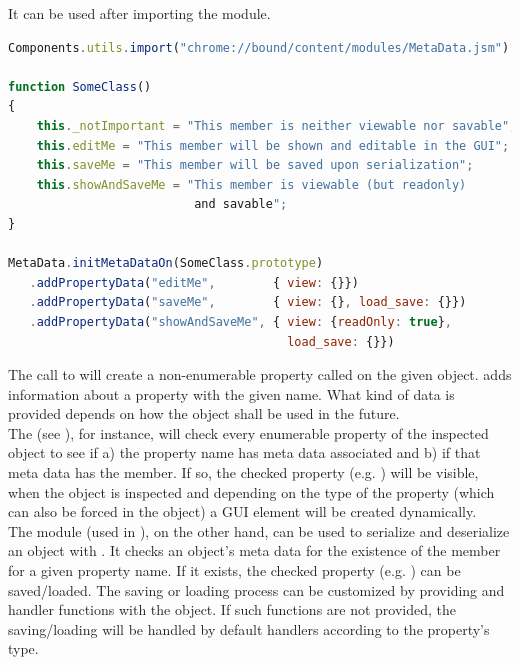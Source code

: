 It can be used after importing the  module.

\SingleSpacing
\begin{lstlisting}[language=JavaScript, caption=Adding meta data to \myProperName{JavaScript} objects]
Components.utils.import("chrome://bound/content/modules/MetaData.jsm")

function SomeClass()
{
	this._notImportant = "This member is neither viewable nor savable";
	this.editMe = "This member will be shown and editable in the GUI";
	this.saveMe = "This member will be saved upon serialization";
	this.showAndSaveMe = "This member is viewable (but readonly)
	                      and savable";
}

MetaData.initMetaDataOn(SomeClass.prototype)
   .addPropertyData("editMe",        { view: {}})
   .addPropertyData("saveMe",        { view: {}, load_save: {}})
   .addPropertyData("showAndSaveMe", { view: {readOnly: true}, 
                                       load_save: {}})
\end{lstlisting}
\OnehalfSpacing

The call to  will create a non-enumerable property called  on the given object.  adds information about a property with the given name. What kind of data is provided depends on how the object shall be used in the future.
\\The {} (see ), for instance, will check every enumerable property of the inspected object to see if a) the property name has meta data associated and b) if that meta data has the  member. If so, the checked property (e.g. ) will be visible, when the object is inspected and depending on the type of the property (which can also be forced in the  object) a GUI element will be created dynamically.
\\The {} module  (used in ), on the other hand, can be used to serialize and deserialize an object with . It checks an object's meta data for the existence of the  member for a given property name. If it exists, the checked property (e.g. ) can be saved/loaded. The saving or loading process can be customized by providing  and  handler functions with the  object. If such functions are not provided, the saving/loading will be handled by default handlers according to the property's type.

